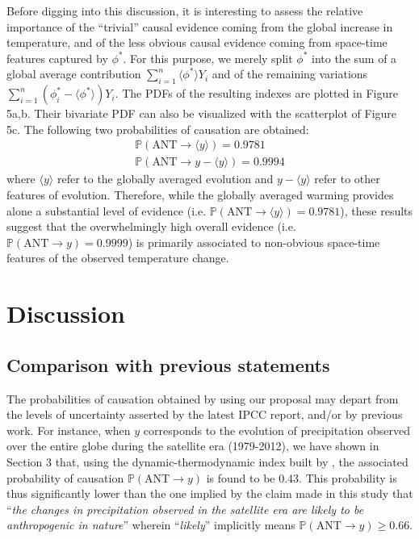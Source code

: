 \documentclass[12pt]{article}
\newcommand{\Proba}{\mathbb P}
\begin{document}
Before digging into this discussion, it is interesting to assess the relative importance of the ``trivial'' causal evidence coming from the global increase in temperature, and of the less obvious causal evidence coming from space-time features captured by $\phi^*$. For this purpose, we merely split $\phi^*$ into the sum of a global average contribution $ \sum_{i=1}^n \langle\phi^*\rangle Y_i$ and of the remaining variations $\sum_{i=1}^n (\phi_i^*-\langle\phi^*\rangle) Y_i$. The PDFs of the resulting indexes are plotted in Figure 5a,b. Their bivariate PDF can also be visualized with the scatterplot of Figure 5c. The following two probabilities of causation are obtained:
\begin{equation}
\label{pns_res}
\begin{array}{ll}
\Proba(\textrm{ANT}\rightarrow \langle y\rangle) = 0.9781\\
\Proba(\textrm{ANT}\rightarrow y-\langle y\rangle) = 0.9994
\end{array}
\end{equation}
where $\langle y\rangle$ refer to the globally averaged evolution and $y-\langle y\rangle$ refer to other features of evolution. Therefore, while the globally averaged warming provides alone a substantial level of evidence (i.e. $\Proba(\textrm{ANT}\rightarrow \langle y\rangle) = 0.9781$), these results suggest that the overwhelmingly high overall evidence (i.e. $\Proba(\textrm{ANT}\rightarrow y) = 0.9999$) is primarily associated to non-obvious space-time features of the observed temperature change. 

\section{Discussion}

\subsection{Comparison with previous statements}

The probabilities of causation obtained by using our proposal may depart from the levels of uncertainty asserted by the latest IPCC report, and/or by previous work. For instance, when $y$ corresponds to the evolution of precipitation observed over the entire globe during the satellite era (1979-2012), we have shown in Section 3 that, using the dynamic-thermodynamic index built by \cite{MB13}, the associated probability of causation $\Proba(\textrm{ANT}\rightarrow y)$ is found to be 0.43. This probability is thus significantly lower than the one implied by the claim made in this study that ``\textit{the changes in precipitation observed in the satellite era are likely to be anthropogenic in nature}'' wherein ``\textit{likely}'' implicitly means $\Proba(\textrm{ANT}\rightarrow y)\geq0.66$.
\end{document}
